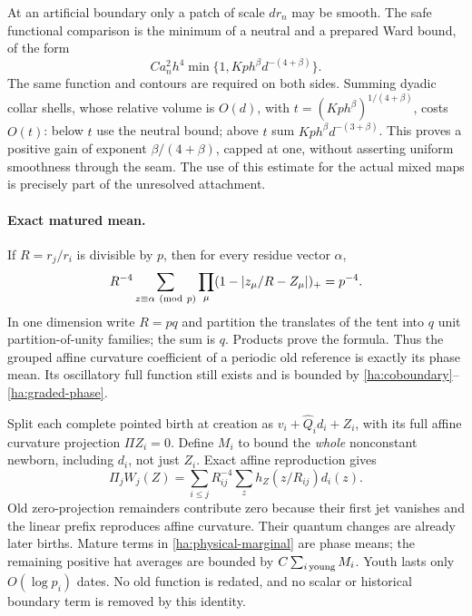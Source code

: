 At an artificial boundary only a patch of scale $d r_n$ may be smooth.
The safe functional comparison is the minimum of a neutral and a
prepared Ward bound, of the form
\begin{equation}
 Ca_n^2h^4\min\{1,Kp h^\beta d^{-(4+\beta)}\}.
 \label{ha:graded-phase}
\end{equation}
The same function and contours are required on both sides.  Summing
dyadic collar shells, whose relative volume is $O(d)$, with
$t=(Kph^\beta)^{1/(4+\beta)}$, costs $O(t)$: below $t$ use the neutral
bound; above $t$ sum $Kph^\beta d^{-(3+\beta)}$.  This proves a positive
gain of exponent $\beta/(4+\beta)$, capped at one, without asserting
uniform smoothness through the seam.  The use of this estimate for the
actual mixed maps is precisely part of the unresolved attachment.

\paragraph{Exact matured mean.}
If $R=r_j/r_i$ is divisible by $p$, then for every residue vector $\alpha$,
\begin{equation}
 R^{-4}\sum_{z\equiv\alpha\ ({\rm mod}\ p)}
       \prod_\mu(1-|z_\mu/R-Z_\mu|)_+=p^{-4}.
 \label{ha:tent-balance}
\end{equation}
In one dimension write $R=pq$ and partition the translates of the tent
into $q$ unit partition-of-unity families; the sum is $q$.  Products
prove the formula.  Thus the grouped affine curvature coefficient of
a periodic old reference is exactly its phase mean.  Its oscillatory
full function still exists and is bounded by
\eqref{ha:coboundary}--\eqref{ha:graded-phase}.

Split each complete pointed birth at creation as
$v_i+\widehat Q_i d_i+Z_i$, with its full affine curvature projection
$\Pi Z_i=0$.  Define $M_i$ to bound the \emph{whole} nonconstant newborn,
including $d_i$, not just $Z_i$.  Exact affine reproduction gives
\begin{equation}
 \Pi_jW_j(Z)=\sum_{i\leq j}R_{ij}^{-4}
                 \sum_zh_Z(z/R_{ij})d_i(z).
 \label{ha:physical-marginal}
\end{equation}
Old zero-projection remainders contribute zero because their first jet
vanishes and the linear prefix reproduces affine curvature.  Their
quantum changes are already later births.  Mature terms in
\eqref{ha:physical-marginal} are phase means; the remaining positive hat
averages are bounded by $C\sum_{i\,{\rm young}}M_i$.  Youth lasts only
$O(\log p_i)$ dates.  No old function is redated, and no scalar or
historical boundary term is removed by this identity.

